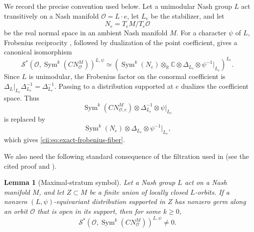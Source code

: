 \documentclass[11pt,reqno]{amsart}
\numberwithin{equation}{section}
\newtheorem{lemma}[theorem]{Lemma}
\theoremstyle{definition}
\theoremstyle{remark}
\newcommand{\C}{\mathbb C}
\newcommand{\R}{\mathbb R}
\newcommand{\Sym}{\operatorname{Sym}}
\newcommand{\cS}{\mathcal S}
\begin{document}
We record the precise convention used below.  Let a unimodular Nash group
\(L\) act transitively on a Nash manifold \(\mathcal O=L\cdot e\), let
\(L_e\) be the stabilizer, and let
\[
  N_e=T_eM/T_e\mathcal O
\]
be the real normal space in an ambient Nash manifold \(M\).  For a character
\(\psi\) of \(L\), Frobenius reciprocity
\cite[Theorem~2.5.7]{AG09}, followed by dualization of the point coefficient,
gives a canonical isomorphism
\begin{equation}\label{cii:eq:exact-frobenius-fiber}
\cS^*\!\left(
  \mathcal O,\Sym^k(CN_{\mathcal O}^{M})
\right)^{L,\psi}
\simeq
\left(
  \Sym^k(N_e)\otimes_{\R}\C
  \otimes\Delta_{L_e}\otimes\psi^{-1}|_{L_e}
\right)^{L_e}.
\end{equation}
Since \(L\) is unimodular, the Frobenius factor on the conormal
coefficient is
\(\Delta_L|_{L_e}\Delta_{L_e}^{-1}=\Delta_{L_e}^{-1}\).  Passing to a
distribution supported at \(e\) dualizes the coefficient space.  Thus
\[
  \Sym^k(CN_{\mathcal O,e}^{M})\otimes
  \Delta_{L_e}^{-1}\otimes\psi|_{L_e}
\]
is replaced by
\[
  \Sym^k(N_e)\otimes\Delta_{L_e}\otimes\psi^{-1}|_{L_e},
\]
which gives \eqref{cii:eq:exact-frobenius-fiber}.

We also need the following standard consequence of the filtration used in
\cite[Theorem~2.5.6]{AG09} (see the cited proof and
\cite[Section~B.2]{AGS08}).

\begin{lemma}[Maximal-stratum symbol]\label{cii:lem:maximal-symbol}
Let a Nash group \(L\) act on a Nash manifold \(M\), and let
\(Z\subset M\) be a finite union of locally closed \(L\)-orbits.  If a
nonzero \((L,\psi)\)-equivariant distribution supported in \(Z\) has
nonzero germ along an orbit \(\mathcal O\) that is open in its support,
then for some \(k\geq0\),
\[
  \cS^*\!\left(
    \mathcal O,\Sym^k(CN_{\mathcal O}^{M})
  \right)^{L,\psi}\neq0.
\]
\end{lemma}
\end{document}

